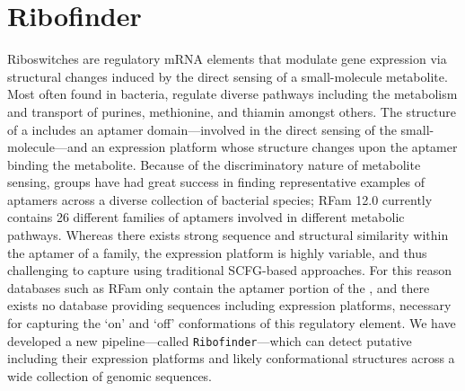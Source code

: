 
\yyyymmdddate
\renewcommand{\dateseparator}{-}
\newcommand{\tabitem}{~~\llap{\textbullet}~~}

\renewcommand*\ttdefault{txtt}
\newcommand{\ms}[1]{\mbox{\tt #1}\xspace}
\newcommand{\seq}{{\bf s}\xspace}
\newcommand{\strS}{{\mathcal S}\xspace}
\newcommand{\strOff}{\ensuremath{{\mathcal S}_{\text{off}}}\xspace}
\newcommand{\strOn}{\ensuremath{{\mathcal S}_{\text{on}}}\xspace}
\newcommand{\strConst}[1]{\ensuremath{{\mathcal C}_{\text{#1}}}\xspace}
\newcommand{\tree}{{\mathcal T}\xspace}
\newcommand{\treeFor}[1]{\ensuremath{{\mathcal T}_{\text #1}}}
\newcommand{\fnaRetrievalTime}{\formatdate{25}{11}{2014} at \formattime{9}{14}{0}}
\newcommand{\textdown}[2]{\ensuremath{{\text{#1}}_{\text{#2}}}}
\newcommand{\treePos}[2]{\textdown{\ms{#1}}{#2}}
\newcommand{\treeIdx}[3]{\treePos{#1}{#2}\ensuremath{(#3)}}

\newcommand{\rfinder}{\ms{Ribofinder}}
\newcommand{\infernal}{\ms{Infernal}}
\newcommand{\tthp}{\ms{TransTermHP}}
\newcommand{\rshapes}{\ms{RNAshapes}}
\newcommand{\rfold}{\ms{RNAfold}}
\newcommand{\foldalign}{\ms{FoldAlign}}

\chapter{Ribofinder} %

\label{Ribofinder} %


Riboswitches are regulatory mRNA elements that modulate gene expression via structural changes induced by the direct sensing of a small-molecule metabolite. Most often found in bacteria, \rbs regulate diverse pathways including the metabolism and transport of purines, methionine, and thiamin amongst others. The structure of a \rb includes an aptamer domain---involved in the direct sensing of the small-molecule---and an expression platform whose structure changes upon the aptamer binding the metabolite. Because of the discriminatory nature of metabolite sensing, groups have had great success in finding representative examples of aptamers across a diverse collection of bacterial species; RFam 12.0 currently contains 26 different families of aptamers involved in different metabolic pathways. Whereas there exists strong sequence and structural similarity within the aptamer of a \rb family, the expression platform is highly variable, and thus challenging to capture using traditional SCFG-based approaches. For this reason databases such as RFam only contain the aptamer portion of the \rb, and there exists no database providing sequences including expression platforms, necessary for capturing the `on' and `off' conformations of this regulatory element. We have developed a new pipeline---called \rfinder---which can detect putative \rbs including their expression platforms and likely conformational structures across a wide collection of genomic sequences.


